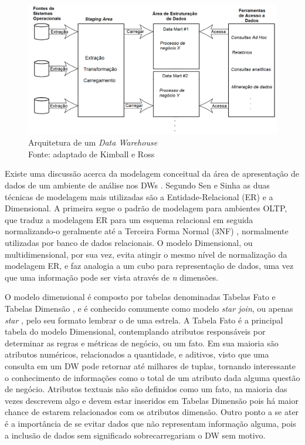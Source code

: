 \begin{figure}[htpb]
	\centering
		\includegraphics[width=\textwidth]{img/dw_arc}
    \caption[Arquitetura de um \textit{Data Warehouse}]
        {Arquitetura de um \textit{Data Warehouse} \\ Fonte: adaptado de Kimball e Ross \cite{kimball2002dw}}
	\label{fig:dw_arq}
\end{figure}

Existe uma discussão acerca da modelagem conceitual da área de apresentação de dados de um ambiente de análise nos DWs \cite{sen2005comparison}. Segundo Sen e Sinha \cite{sen2005comparison} as duas técnicas de modelagem mais utilizadas são a Entidade-Relacional (ER) e a Dimensional. A primeira segue o padrão de modelagem para ambientes OLTP, que traduz a modelagem ER para um esquema relacional em seguida normalizando-o geralmente até a Terceira Forma Normal (3NF) \cite{kimball2002dw}, normalmente utilizadas por banco de dados relacionais. O modelo Dimensional, ou multidimensional, por sua vez, evita atingir o mesmo nível de normalização da modelagem ER, e faz analogia a um cubo para representação de dados, uma vez que uma informação pode ser vista através de \textit{n} dimensões. 

O modelo dimensional é composto por tabelas denominadas Tabelas Fato e Tabelas Dimensão \cite{kimball2002dw}, e é conhecido comumente como modelo \textit{star join}, ou apenas \textit{star} \cite{sen2005comparison}, pelo seu formato lembrar o de uma estrela. A Tabela Fato é a principal tabela do modelo Dimensional, contemplando atributos responsáveis por determinar as regras e métricas de negócio, ou um fato. Em sua maioria são atributos numéricos, relacionados a quantidade, e aditivos, visto que uma consulta em um DW pode retornar até milhares de tuplas, tornando interessante o conhecimento de informações como o total de um atributo dada alguma questão de negócio. Atributos textuais não são definidos como um fato, na maioria das vezes descrevem algo e devem estar inseridos em Tabelas Dimensão pois há maior chance de estarem relacionados com os atributos dimensão. Outro ponto a se ater é a importância de se evitar dados que não representam informação alguma, pois a inclusão de dados sem significado sobrecarregariam o DW sem motivo.

